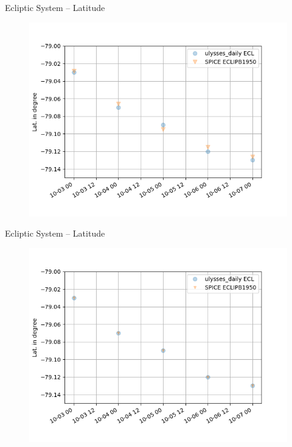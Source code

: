 \documentclass{beamer}
\begin{document}
\begin{frame}{Ecliptic System -- Latitude}
\begin{figure}									
	\includegraphics[width=1.0\textwidth]{Pics/ECL_LAT_zoom.png}
\end{figure}
\end{frame}

\begin{frame}{Ecliptic System -- Latitude}
\begin{figure}									
	\includegraphics[width=1.0\textwidth]{Pics/ECL_LAT_zoom_rou.png}
\end{figure}
\end{frame}
\end{document}

